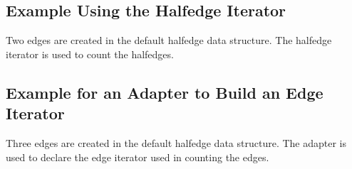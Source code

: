 \subsection{Example Using the Halfedge Iterator}

Two edges are created in the default halfedge data structure.
The halfedge iterator is used to count the halfedges.


\subsection{Example for an Adapter to Build an Edge Iterator}

Three edges are created in the default halfedge data structure.
The adapter  is used to declare the edge
iterator used in counting the edges.




